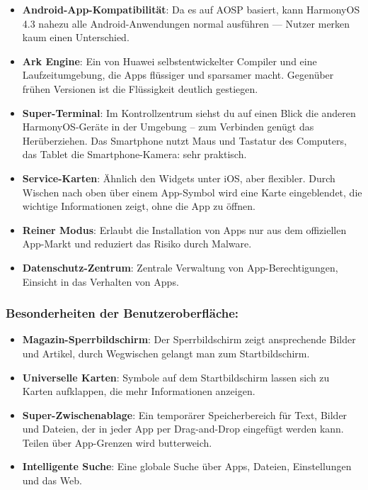 \begin{itemize}
  \item \textbf{Android-App-Kompatibilität}: Da es auf AOSP basiert, kann HarmonyOS 4.3 nahezu alle Android-Anwendungen normal ausführen — Nutzer merken kaum einen Unterschied.
  \item \textbf{Ark Engine}: Ein von Huawei selbstentwickelter Compiler und eine Laufzeitumgebung, die Apps flüssiger und sparsamer macht. Gegenüber frühen Versionen ist die Flüssigkeit deutlich gestiegen.
  \item \textbf{Super-Terminal}: Im Kontrollzentrum siehst du auf einen Blick die anderen HarmonyOS-Geräte in der Umgebung – zum Verbinden genügt das Herüberziehen. Das Smartphone nutzt Maus und Tastatur des Computers, das Tablet die Smartphone-Kamera: sehr praktisch.
  \item \textbf{Service-Karten}: Ähnlich den Widgets unter iOS, aber flexibler. Durch Wischen nach oben über einem App-Symbol wird eine Karte eingeblendet, die wichtige Informationen zeigt, ohne die App zu öffnen.
  \item \textbf{Reiner Modus}: Erlaubt die Installation von Apps nur aus dem offiziellen App-Markt und reduziert das Risiko durch Malware.
  \item \textbf{Datenschutz-Zentrum}: Zentrale Verwaltung von App-Berechtigungen, Einsicht in das Verhalten von Apps.
\end{itemize}

\subsubsection*{Besonderheiten der Benutzeroberfläche:}

\begin{itemize}
  \item \textbf{Magazin-Sperrbildschirm}: Der Sperrbildschirm zeigt ansprechende Bilder und Artikel, durch Wegwischen gelangt man zum Startbildschirm.
  \item \textbf{Universelle Karten}: Symbole auf dem Startbildschirm lassen sich zu Karten aufklappen, die mehr Informationen anzeigen.
  \item \textbf{Super-Zwischenablage}: Ein temporärer Speicherbereich für Text, Bilder und Dateien, der in jeder App per Drag-and-Drop eingefügt werden kann. Teilen über App-Grenzen wird butterweich.
  \item \textbf{Intelligente Suche}: Eine globale Suche über Apps, Dateien, Einstellungen und das Web.
\end{itemize}

